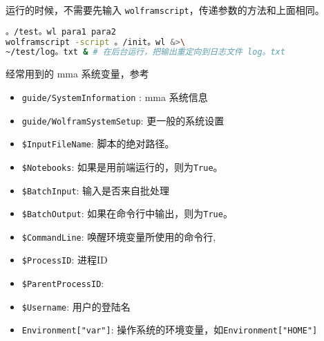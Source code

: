 运行的时候，不需要先输入 \verb`wolframscript`，传递参数的方法和上面相同。

\begin{lstlisting}[language=bash]
。/test。wl para1 para2
wolframscript -script 。/init。wl &>\
~/test/log。txt & # 在后台运行，把输出重定向到日志文件 log。txt
\end{lstlisting}

经常用到的 mma 系统变量，参考

\begin{itemize}
\item \verb`guide/SystemInformation` : mma 系统信息
\item \verb`guide/WolframSystemSetup`: 更一般的系统设置
\item \verb`$InputFileName`: 脚本的绝对路径。
\item \verb`$Notebooks`: 如果是用前端运行的，则为\verb`True`。
\item \verb`$BatchInput`: 输入是否来自批处理
\item \verb`$BatchOutput`: 如果在命令行中输出，则为\verb`True`。
\item \verb`$CommandLine`: 唤醒环境变量所使用的命令行,
\item \verb`$ProcessID`: 进程ID
\item \verb`$ParentProcessID`:
\item \verb`$Username`: 用户的登陆名
\item \verb`Environment["var"]`: 操作系统的环境变量，如\verb`Environment["HOME"]`
\end{itemize}
